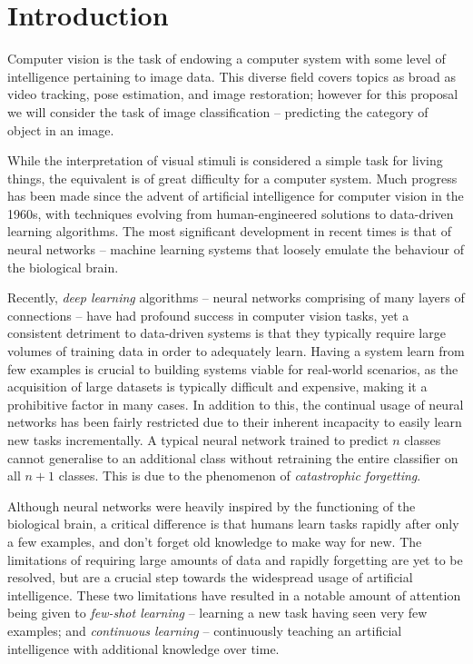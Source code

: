 \documentclass{report}
\begin{document}
\chapter{Introduction}
Computer vision is the task of endowing a computer system with some level of intelligence pertaining to image data. This diverse field covers topics as broad as video tracking, pose estimation, and image restoration; however for this proposal we will consider the task of image classification -- predicting the category of object in an image. \par
While the interpretation of visual stimuli is considered a simple task for living things, the equivalent is of great difficulty for a computer system. Much progress has been made since the advent of artificial intelligence for computer vision in the 1960s, with techniques evolving from human-engineered solutions to data-driven learning algorithms. The most significant development in recent times is that of neural networks -- machine learning systems that loosely emulate the behaviour of the biological brain. \par
Recently, \emph{deep learning} algorithms -- neural networks comprising of many layers of connections -- have had profound success in computer vision tasks, yet a consistent detriment to data-driven systems is that they typically require large volumes of training data in order to adequately learn. Having a system learn from few examples is crucial to building systems viable for real-world scenarios, as the acquisition of large datasets is typically difficult and expensive, making it a prohibitive factor in many cases. In addition to this, the continual usage of neural networks has been fairly restricted due to their inherent incapacity to easily learn new tasks incrementally. A typical neural network trained to predict $n$ classes cannot generalise to an additional class without retraining the entire classifier on all $n+1$ classes. This is due to the phenomenon of \textit{catastrophic forgetting}. \par
Although neural networks were heavily inspired by the functioning of the biological brain, a critical difference is that humans learn tasks rapidly after only a few examples, and don't forget old knowledge to make way for new. The limitations of requiring large amounts of data and rapidly forgetting are yet to be resolved, but are a crucial step towards the widespread usage of artificial intelligence. These two limitations have resulted in a notable amount of attention being given to \emph{few-shot learning}\parencite{maml}\parencite{relationnet} -- learning a new task having seen very few examples; and  \emph{continuous learning}\parencite{lwf}\parencite{ewc}\parencite{hat} -- continuously teaching an artificial intelligence with additional knowledge over time. 
\end{document}
